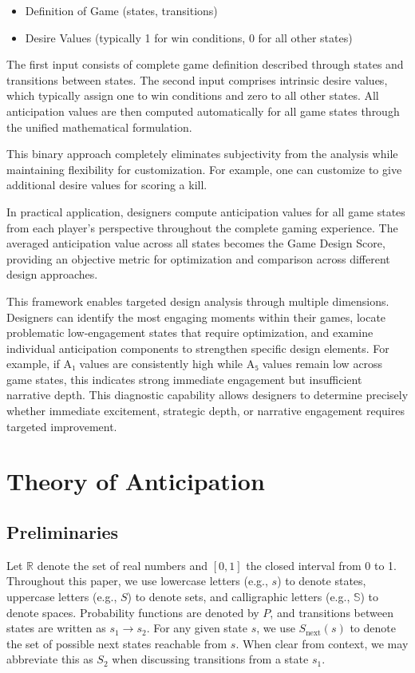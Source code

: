 \documentclass{article}
\begin{document}
\begin{itemize}
   \item Definition of Game (states, transitions)
   \item Desire Values (typically 1 for win conditions, 0 for all other states)
\end{itemize}

The first input consists of complete game definition described through states and transitions between states. The second input comprises intrinsic desire values, which typically assign one to win conditions and zero to all other states. All anticipation values are then computed automatically for all game states through the unified mathematical formulation.

This binary approach completely eliminates subjectivity from the analysis while maintaining flexibility for customization. For example, one can customize to give additional desire values for scoring a kill.

In practical application, designers compute anticipation values for all game states from each player's perspective throughout the complete gaming experience. The averaged anticipation value across all states becomes the Game Design Score, providing an objective metric for optimization and comparison across different design approaches.

This framework enables targeted design analysis through multiple dimensions. Designers can identify the most engaging moments within their games, locate problematic low-engagement states that require optimization, and examine individual anticipation components to strengthen specific design elements. For example, if A₁ values are consistently high while A₅ values remain low across game states, this indicates strong immediate engagement but insufficient narrative depth. This diagnostic capability allows designers to determine precisely whether immediate excitement, strategic depth, or narrative engagement requires targeted improvement.

\section{Theory of Anticipation}
\subsection{Preliminaries}
Let $\mathbb{R}$ denote the set of real numbers and $[0,1]$ the closed interval from 0 to 1. Throughout this paper, we use lowercase letters (e.g., $s$) to denote states, uppercase letters (e.g., $S$) to denote sets, and calligraphic letters (e.g., $\mathbb{S}$) to denote spaces. Probability functions are denoted by $P$, and transitions between states are written as $s_1 \rightarrow s_2$.
For any given state $s$, we use $S_{\text{next}}(s)$ to denote the set of possible next states reachable from $s$. When clear from context, we may abbreviate this as $S_2$ when discussing transitions from a state $s_1$.
\end{document}
